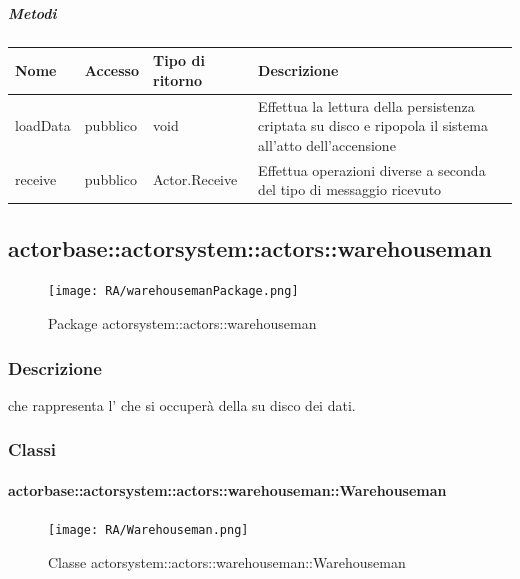 \documentclass{scalatekids-article}
\begin{document}
\subparagraph{Metodi}

\begin{tabular}{| l | l | l | l |}
  \hline
  Nome & Accesso & Tipo di ritorno & Descrizione\\
  \hline
  loadData & pubblico & void & Effettua la lettura della persistenza criptata su disco e ripopola il sistema all'atto dell'accensione\\
  \hline
  receive & pubblico & Actor.Receive & Effettua operazioni diverse a seconda del tipo di messaggio ricevuto\\
  \hline
\end{tabular}


\subsection{actorbase::actorsystem::actors::warehouseman}
\label{sec:actorbase::actorsystem::actors::warehouseman}

\begin{figure}[H]
  \begin{center}
    \texttt{[image: RA/warehousemanPackage.png]}
    \caption{Package actorsystem::actors::warehouseman}
  \end{center}
\end{figure}

\subsubsection{Descrizione}

 che rappresenta l' che si occuperà della
 su disco dei dati.

\subsubsection{Classi}

\paragraph{actorbase::actorsystem::actors::warehouseman::Warehouseman}
\label{sec:actorbase::actorsystem::actors::warehouseman::Warehouseman}

\begin{figure}[H]
  \begin{center}
    \texttt{[image: RA/Warehouseman.png]}
    \caption{Classe actorsystem::actors::warehouseman::Warehouseman}
  \end{center}
\end{figure}
\end{document}
